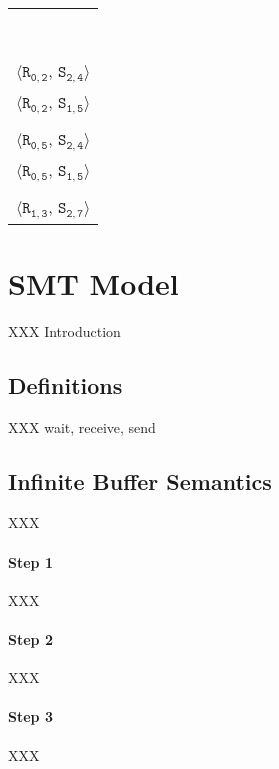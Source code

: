 \newsavebox{\boxMP}
\begin{lrbox}{\boxMP}
\normalsize
\begin{tabular}[t]{l}
\\\\\\\\\\\\\\\\\\
$\langle\mathtt{R_{0,2}}$, $\mathtt{S_{2,4}}\rangle$\\
$\langle\mathtt{R_{0,2}}$, $\mathtt{S_{1,5}}\rangle$\\
\\
$\langle\mathtt{R_{0,5}}$, $\mathtt{S_{2,4}}\rangle$\\
$\langle\mathtt{R_{0,5}}$, $\mathtt{S_{1,5}}\rangle$\\
\\
$\langle\mathtt{R_{1,3}}$, $\mathtt{S_{2,7}}\rangle$\\
\end{tabular}
\end{lrbox}


\section{SMT Model}\label{sec:smt}

XXX Introduction

\subsection{Definitions}

XXX wait, receive, send

\subsection{Infinite Buffer Semantics}

XXX

\paragraph{Step 1} XXX
\paragraph{Step 2} XXX
\paragraph{Step 3} XXX
